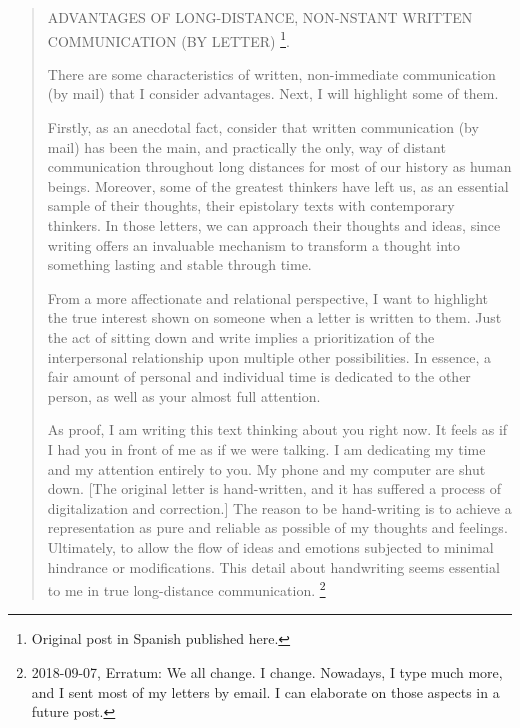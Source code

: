 \documentclass[]{book}
\let\rmarkdownfootnote\footnote%
\def\footnote{\protect\rmarkdownfootnote}
\begin{document}
\begin{quote}
ADVANTAGES OF LONG-DISTANCE, NON-NSTANT WRITTEN COMMUNICATION (BY LETTER) \footnote{Original post in Spanish published here.}.

There are some characteristics of written, non-immediate communication (by mail) that I consider advantages. Next, I will highlight some of them.

Firstly, as an anecdotal fact, consider that written communication (by mail) has been the main, and practically the only, way of distant communication throughout long distances for most of our history as human beings. Moreover, some of the greatest thinkers have left us, as an essential sample of their thoughts, their epistolary texts with contemporary thinkers. In those letters, we can approach their thoughts and ideas, since writing offers an invaluable mechanism to transform a thought into something lasting and stable through time.

From a more affectionate and relational perspective, I want to highlight the true interest shown on someone when a letter is written to them. Just the act of sitting down and write implies a prioritization of the interpersonal relationship upon multiple other possibilities. In essence, a fair amount of personal and individual time is dedicated to the other person, as well as your almost full attention.

As proof, I am writing this text thinking about you right now. It feels as if I had you in front of me as if we were talking. I am dedicating my time and my attention entirely to you. My phone and my computer are shut down. {[}The original letter is hand-written, and it has suffered a process of digitalization and correction.{]} The reason to be hand-writing is to achieve a representation as pure and reliable as possible of my thoughts and feelings. Ultimately, to allow the flow of ideas and emotions subjected to minimal hindrance or modifications. This detail about handwriting seems essential to me in true long-distance communication. \footnote{2018-09-07, Erratum: We all change. I change. Nowadays, I type much more, and I sent most of my letters by email. I can elaborate on those aspects in a future post.}


\end{quote}
\end{document}

